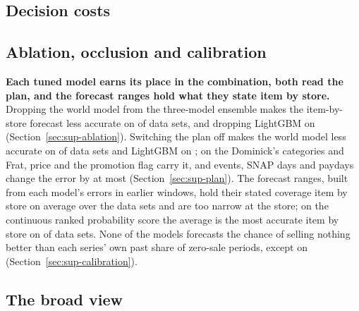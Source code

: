 

\ifjournal
\subsection{Decision costs}
\label{sec:rq-decisions}


\fi

\subsection{Ablation, occlusion and calibration}
\label{sec:rq-checks}

\textbf{Each tuned model earns its place in the combination, both read the
plan, and the forecast ranges hold what they state item by store.} Dropping the
world model from the three-model ensemble makes the item-by-store forecast less
accurate on \sfAblNoWmWorse{} of \rqNineWord{} data sets, and dropping LightGBM
on \sfAblNoLgbWorse{} (Section~\ref{sec:sup-ablation}). Switching the plan off
makes the world model less accurate on \supPertPlanHelpsWm{} of \supPertSets{}
data sets and LightGBM on \supPertPlanHelpsLgb{}; on the Dominick's categories
and Frat, price and the promotion flag carry it, and events, SNAP days and
paydays change the error by at most \sfCalendarMax{}
(Section~\ref{sec:sup-plan}). The forecast ranges, built from each model's
errors in earlier windows, hold their stated coverage item by store on average over
the data sets and are too narrow at the store; on the continuous ranked probability score the average is
the most accurate item by store on \sfCrpsAvgBestIxs{} of \rqNineWord{} data
sets. None of the models forecasts the chance of selling nothing better than
each series' own past share of zero-sale periods, except on
\sfBrierBeatsClimNames{} (Section~\ref{sec:sup-calibration}).

\subsection{The broad view}
\label{sec:rq-broad}

